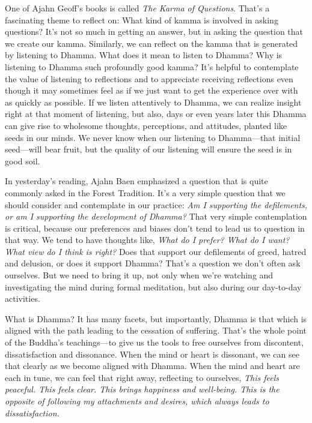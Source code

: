 One of Ajahn Geoff's books is called \emph{The Karma of Questions}. 
That's a fascinating theme to reflect on: What kind of kamma is 
involved in asking questions? It's not so much in getting an answer, 
but in asking the question that we create our kamma. Similarly, we can 
reflect on the kamma that is generated by listening to Dhamma. What 
does it mean to listen to Dhamma? Why is listening to Dhamma such 
profoundly good kamma? It's helpful to contemplate the value of 
listening to reflections and to appreciate receiving reflections even 
though it may sometimes feel as if we just want to get the experience 
over with as quickly as possible. If we listen attentively to Dhamma, 
we can realize insight right at that moment of listening, but also, 
days or even years later this Dhamma can give rise to wholesome 
thoughts, perceptions, and attitudes, planted like seeds in our minds. 
We never know when our listening to Dhamma---that initial seed---will 
bear fruit, but the quality of our listening will ensure the seed is in 
good soil.


In yesterday's reading, Ajahn Baen emphasized a question that is quite 
commonly asked in the Forest Tradition. It's a very simple question 
that we should consider and contemplate in our practice: \emph{Am I 
supporting the defilements, or am I supporting the development of 
Dhamma?} That very simple contemplation is critical, because our 
preferences and biases don't tend to lead us to question in that way. 
We tend to have thoughts like, \emph{What do I prefer? What do I want? 
What view do I think is right?} Does that support our defilements of 
greed, hatred and delusion, or does it support Dhamma? That's a 
question we don't often ask ourselves. But we need to bring it up, not 
only when we're watching and investigating the mind during formal 
meditation, but also during our day-to-day activities.

What is Dhamma? It has many facets, but importantly, Dhamma is that 
which is aligned with the path leading to the cessation of suffering. 
That's the whole point of the Buddha's teachings---to give us the tools 
to free ourselves from discontent, dissatisfaction and dissonance. When 
the mind or heart is dissonant, we can see that clearly as we become 
aligned with Dhamma. When the mind and heart are each in tune, we can 
feel that right away, reflecting to ourselves, \emph{This feels 
peaceful. This feels clear. This brings happiness and well-being. This 
is the opposite of following my attachments and desires, which always 
leads to dissatisfaction.}

